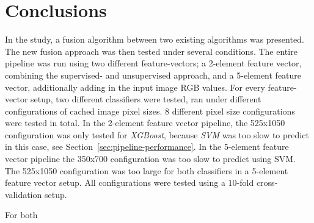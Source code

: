 
\section{Conclusions}\label{sec:conclusions}
In the study, a fusion algorithm between two existing algorithms was presented. The new fusion approach was then tested under several conditions. The entire pipeline was run using two different feature-vectors; a 2-element feature vector, combining the supervised- and unsupervised approach, and a 5-element feature vector, additionally adding in the input image RGB values. For every feature-vector setup, two different classifiers were tested, ran under different configurations of cached image pixel sizes. 8 different pixel size configurations were tested in total. In the 2-element feature vector pipeline, the 525x1050 configuration was only tested for \textit{XGBoost}, because \textit{SVM} was too slow to predict in this case, see Section~\ref{sec:pipeline-performance}. In the 5-element feature vector pipeline the 350x700 configuration was too slow to predict using SVM. The 525x1050 configuration was too large for both classifiers in a 5-element feature vector setup. All configurations were tested using a $10$-fold cross-validation setup.

For both




